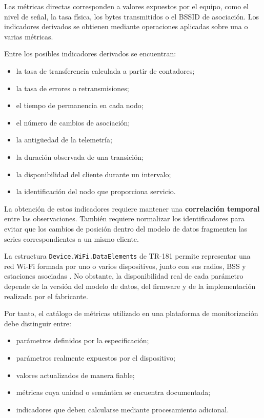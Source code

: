 Las métricas directas corresponden a valores expuestos por el equipo,
como el nivel de señal, la tasa física, los bytes transmitidos o el
BSSID de asociación. Los indicadores derivados se obtienen mediante
operaciones aplicadas sobre una o varias métricas.

Entre los posibles indicadores derivados se encuentran:

\begin{itemize}
    \item la tasa de transferencia calculada a partir de contadores;
    \item la tasa de errores o retransmisiones;
    \item el tiempo de permanencia en cada nodo;
    \item el número de cambios de asociación;
    \item la antigüedad de la telemetría;
    \item la duración observada de una transición;
    \item la disponibilidad del cliente durante un intervalo;
    \item la identificación del nodo que proporciona servicio.
\end{itemize}

La obtención de estos indicadores requiere mantener una
\textbf{correlación temporal} entre las observaciones. También requiere
normalizar los identificadores para evitar que los cambios de posición
dentro del modelo de datos fragmenten las series correspondientes a un
mismo cliente.

La estructura \texttt{Device.WiFi.DataElements} de TR-181 permite
representar una red Wi-Fi formada por uno o varios dispositivos, junto
con sus radios, BSS y estaciones asociadas
\cite{bbf_tr181}. No obstante, la disponibilidad real de cada parámetro
depende de la versión del modelo de datos, del firmware y de la
implementación realizada por el fabricante.

Por tanto, el catálogo de métricas utilizado en una plataforma de
monitorización debe distinguir entre:

\begin{itemize}
    \item parámetros definidos por la especificación;
    \item parámetros realmente expuestos por el dispositivo;
    \item valores actualizados de manera fiable;
    \item métricas cuya unidad o semántica se encuentra documentada;
    \item indicadores que deben calcularse mediante procesamiento
    adicional.
\end{itemize}

